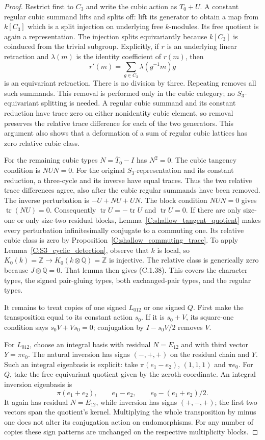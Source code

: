 \begin{proof}
Restrict first to $C_3$ and write the cubic action as $T_0+U$.
A constant regular cubic summand lifts and splits off: lift its generator to obtain a
map from $k[C_3]$ which is a split injection on underlying
free $k$-modules. Its free quotient is again a representation.
The injection splits equivariantly because $k[C_3]$ is
coinduced from the trivial subgroup. Explicitly, if $r$ is an
underlying linear retraction and $\lambda(m)$ is the identity
coefficient of $r(m)$, then
\[
       r'(m)=\sum_{g\in C_3}\lambda(g^{-1}m)g
\]
is an equivariant retraction. There is no division by three. Repeating removes all such summands.
This removal is performed only in the cubic category; no
$S_3$-equivariant splitting is needed. A regular cubic summand
and its constant reduction have trace zero on either nonidentity
cubic element, so removal preserves the relative trace difference
for each of the two generators. This argument also shows that a
deformation of a sum of regular cubic lattices has zero relative
cubic class.

For the remaining cubic types $N=\overline T_0-I$ has
$N^2=0$. The cubic tangency condition is $NUN=0$.
For the original $S_3$-representation and its constant reduction,
a three-cycle and its inverse have equal traces. Thus the two
relative trace differences agree, also after the cubic regular
summands have been removed. The inverse perturbation is $-U+NU+UN$. The block condition
$NUN=0$ gives $\operatorname{tr}(NU)=0$.
Consequently $\operatorname{tr}U=-\operatorname{tr}U$ and
$\operatorname{tr}U=0$.
If there are only size-one or only size-two residual blocks,
Lemma~\ref{C:shallow_tangent_quotient} makes every perturbation
infinitesimally conjugate to a commuting one. Its relative
cubic class is zero by Proposition~\ref{C:shallow_commuting_trace}.
To apply Lemma~\ref{C:S3_cyclic_detection}, observe that $k$
is local, so $K_0(k)=\mathbb Z\to K_0(k\otimes\mathbb Q)=\mathbb Z$
is injective. The relative class is generically zero because
$J\otimes\mathbb Q=0$. That lemma then gives (C.1.38).
This covers the character types, the signed pair-gluing
types, both exchanged-pair types, and the regular types.

It remains to treat copies of one signed $L_{012}$ or one
signed $Q$. First make the transposition equal to its
constant action $s_0$. If it is $s_0+V$, its square-one
condition says $s_0V+Vs_0=0$; conjugation by
$I-s_0V/2$ removes $V$.

For $L_{012}$, choose an integral basis with residual
$N=E_{12}$ and with third vector $Y=\pi e_0$. The natural
inversion has signs $(-,+,+)$ on the residual chain and
$Y$. Such an integral eigenbasis is explicit: take
$\pi(e_1-e_2)$, $(1,1,1)$ and $\pi e_0$.
For $Q$, take the free equivariant quotient given by the
zeroth coordinate. An integral inversion eigenbasis is
\[
 \pi(e_1+e_2),\qquad e_1-e_2,\qquad
                      e_0-(e_1+e_2)/2.
\]
It again has residual $N=E_{12}$, while inversion has
signs $(+,-,+)$; the first two vectors span the quotient's
kernel. Multiplying the whole transposition by minus one
does not alter its conjugation action on endomorphisms.
For any number of copies these sign patterns are unchanged
on the respective multiplicity blocks.


\end{proof}
